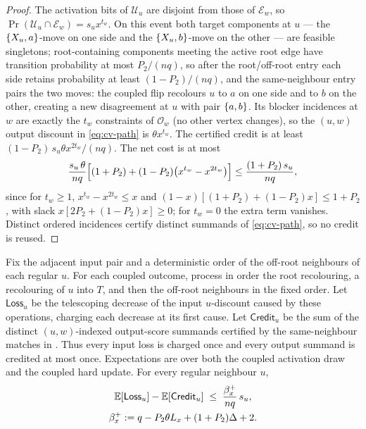 \begin{proof}
The activation bits of \(\mathcal U_u\) are disjoint from those of
\(\mathcal E_w\), so
\(\Pr(\mathcal U_u\cap\mathcal E_w)=s_u x^{t_w}\). On this event both target
components at $u$ --- the $\left\{X_u,a\right\}$-move on one side and the
$\left\{X_u,b\right\}$-move on the other --- are feasible singletons; root-containing
components meeting the active root edge have transition probability at most
$P_2/(nq)$, so after the root/off-root entry each side retains probability
at least $(1-P_2)/(nq)$, and the same-neighbour entry pairs the two moves: the coupled flip
recolours $u$ to $a$ on one side and to $b$ on the other, creating a new
disagreement at $u$ with pair $\left\{a,b\right\}$. Its blocker incidences at $w$
are exactly the \(t_w\) constraints of $\mathcal O_w$ (no other vertex
changes), so the $(u,w)$ output discount in \eqref{eq:cv-path} is
\(\theta x^{t_w}\). The certified credit is at least
\((1-P_2)\,s_u\theta x^{2t_w}/(nq)\). The net cost
is at most
\[
  \frac{s_u\,\theta}{nq}\Bigl[(1+P_2)
    +(1-P_2)\bigl(x^{t_w}-x^{2t_w}\bigr)\Bigr]
  \le\frac{(1+P_2)\,s_u}{nq},
\]
since for \(t_w\ge1\), \(x^{t_w}-x^{2t_w}\le x\) and
$(1-x)[(1+P_2)+(1-P_2)x]\le1+P_2$, with slack $x[2P_2+(1-P_2)x]\ge0$; for
\(t_w=0\) the extra term vanishes. Distinct ordered incidences certify distinct
summands of \eqref{eq:cv-path}, so no credit is reused.
\end{proof}

\begin{lemma}\label{lem:cv-expected}
Fix the adjacent input pair and a deterministic order of the off-root
neighbours of each regular \(u\).  For each coupled outcome, process in order
the root recolouring, a recolouring of \(u\) into \(T\), and then the
off-root neighbours in the fixed order.  Let \(\mathsf{Loss}_u\) be the
telescoping decrease of the input \(u\)-discount caused by these operations,
charging each decrease at its first cause.  Let \(\mathsf{Credit}_u\) be the
sum of the distinct \((u,w)\)-indexed output-score summands certified by the
same-neighbour matches in .
Thus every input loss is charged once and every output summand is credited at
most once.  Expectations are over both the coupled activation draw and the
coupled hard update.  For every regular neighbour \(u\),
\begin{gather*}
  \operatorname{\mathbb{E}}[\mathsf{Loss}_u]-\operatorname{\mathbb{E}}[\mathsf{Credit}_u]
  \;\le\;\frac{\beta^{+}_x}{nq}\,s_u ,\\
  \beta^{+}_x:=q-P_2\theta L_x+(1+P_2)\Delta+2 .
\end{gather*}
\end{lemma}

